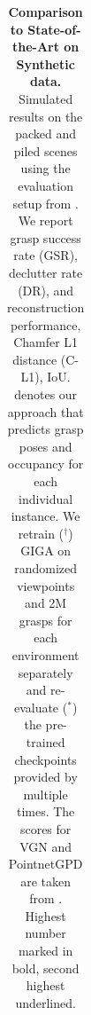 \begin{table}[t!]
\begin{tabular}{lrr|cc||cc|cc}
 
\bottomrule
\end{tabular}
\caption{\textbf{Comparison to State-of-the-Art on Synthetic data.}
    Simulated results on the packed and piled scenes using the evaluation setup from \cite{huang2022edge}. We report grasp success rate (GSR), declutter rate (DR), and reconstruction performance, Chamfer L1 distance (C-L1), IoU. \OurMethod{} denotes our approach that predicts grasp poses and occupancy for each individual instance. We retrain ($^\dagger$) GIGA on randomized viewpoints and 2M grasps for each environment separately and re-evaluate ($^*$) the pre-trained checkpoints provided by \cite{huang2022edge} multiple times. The scores for VGN and PointnetGPD are taken from \cite{huang2022edge}. Highest number marked in bold, second highest underlined. }
    \label{tab:giga_sim_res}
\vspace{-15px}
\end{table}
